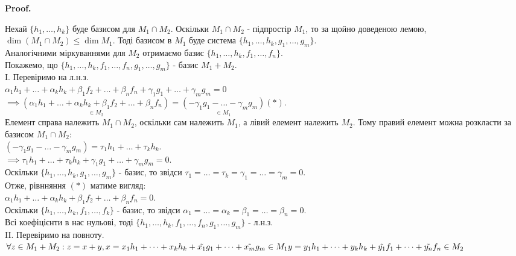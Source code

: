 \documentclass[a4paper, 10pt]{article}
\makeatletter
\def\qed{$\blacksquare$}
\theoremstyle{theoremdd}
\theoremstyle{theoremdd}
\theoremstyle{theoremdd}
\theoremstyle{theoremdd}
\theoremstyle{theoremdd}
\theoremstyle{theoremdd}
\theoremstyle{theoremdd}
\theoremstyle{theoremdd}
\renewenvironment{proof}[1][Proof.\\]{\par
\pushQED{\hfill \qed}%
\normalfont \topsep6\p@\@plus6\p@\relax
\trivlist
\item\relax
{\bfseries
#1\@addpunct{.}}\hspace\labelsep\ignorespaces
}{%
\popQED\endtrivlist\@endpefalse
}
\makeatother
\begin{document}
	\begin{proof}
	Нехай $\{h_1, \dots, h_k\}$ буде базисом для $M_1 \cap M_2$. Оскільки $M_1 \cap M_2$ - підпростір $M_1$, то за щойно доведеною лемою, $\dim (M_1 \cap M_2) \leq \dim M_1$. Тоді базисом в $M_1$ буде система $\{h_1, \dots, h_k, g_1, \dots, g_m\}$.\\
	Аналогічними міркуваннями для $M_2$ отримаємо базис $\{h_1, \dots, h_k, f_1, \dots, f_n\}$.\\
	Покажемо, що $\{h_1, \dots, h_k, f_1, \dots, f_n, g_1, \dots, g_m\}$ - базис $M_1 + M_2$.
	\bigskip \\
	I. Перевіримо на л.н.з.\\
	$\alpha_1 h_1 + \dots + \alpha_k h_k + \beta_1 f_2 + \dots + \beta_n f_n + \gamma_1 g_1 + \dots + \gamma_m g_m = 0$\\
	$\implies \underset{\in M_2}{(\alpha_1 h_1 + \dots + \alpha_k h_k + \beta_1 f_2 + \dots + \beta_n f_n)} = \underset{\in M_1}{(-\gamma_1 g_1 - \dots - \gamma_m g_m)} (*)$.\\
	Елемент справа належить $M_1 \cap M_2$, оскільки сам належить $M_1$, а лівий елемент належить $M_2$. Тому правий елемент можна розкласти за базисом $M_1 \cap M_2$:\\
	$(-\gamma_1 g_1 - \dots - \gamma_m g_m) = \tau_1 h_1 + \dots + \tau_k h_k$.\\
	$\implies \tau_1 h_1 + \dots + \tau_k h_k +\gamma_1 g_1 + \dots + \gamma_m g_m = 0$.\\
	Оскільки $\{h_1, \dots, h_k, g_1, \dots, g_m\}$ - базис, то звідси $\tau_1 = \dots = \tau_k = \gamma_1 = \dots = \gamma_m = 0$.\\
	Отже, рівнняння $(*)$ матиме вигляд:\\
	$\alpha_1 h_1 + \dots + \alpha_k h_k + \beta_1 f_2 + \dots + \beta_n f_n = 0$.\\
	Оскільки $\{h_1, \dots, h_k, f_1, \dots, f_k\}$ - базис, то звідси $\alpha_1 = \dots = \alpha_k = \beta_1 = \dots = \beta_n = 0$.\\
	Всі коефіцієнти в нас нульові, тоді $\{h_1, \dots, h_k, f_1, \dots, f_n, g_1, \dots, g_m\}$ - л.н.з.
	\bigskip \\
	II. Перевіримо на повноту.\\
	$\forall z \in M_1 + M_2: z = x + y, \\x = x_1 h_1 + \dots + x_k h_k + \tilde{x_1}g_1 + \dots + \tilde{x_m}g_m \in M_1 \\ y = y_1 h_1 + \dots + y_k h_k + \tilde{y_1}f_1 + \dots + \tilde{y_n}f_n \in M_2$\\

\end{proof}
\end{document}
